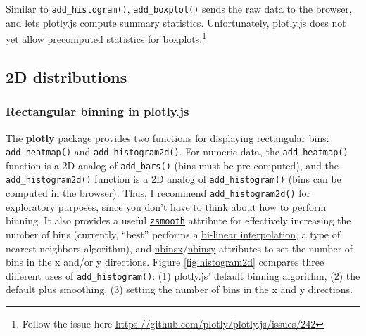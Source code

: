 \documentclass[12pt,]{isuthesis}
\let\rmarkdownfootnote\footnote%
\def\footnote{\protect\rmarkdownfootnote}
\begin{document}
Similar to \texttt{add\_histogram()}, \texttt{add\_boxplot()} sends the
raw data to the browser, and lets plotly.js compute summary statistics.
Unfortunately, plotly.js does not yet allow precomputed statistics for
boxplots.\footnote{Follow the issue here
  \url{https://github.com/plotly/plotly.js/issues/242}}

\subsection{2D distributions}\label{d-distributions}

\subsubsection{Rectangular binning in
plotly.js}\label{rectangular-binning-in-plotly.js}

The \textbf{plotly} package provides two functions for displaying
rectangular bins: \texttt{add\_heatmap()} and
\texttt{add\_histogram2d()}. For numeric data, the
\texttt{add\_heatmap()} function is a 2D analog of \texttt{add\_bars()}
(bins must be pre-computed), and the \texttt{add\_histogram2d()}
function is a 2D analog of \texttt{add\_histogram()} (bins can be
computed in the browser). Thus, I recommend \texttt{add\_histogram2d()}
for exploratory purposes, since you don't have to think about how to
perform binning. It also provides a useful
\href{https://plot.ly/r/reference/\#histogram2d-zsmooth}{\texttt{zsmooth}}
attribute for effectively increasing the number of bins (currently,
``best'' performs a
\href{https://en.wikipedia.org/wiki/Bilinear_interpolation}{bi-linear
interpolation}, a type of nearest neighbors algorithm), and
\href{https://plot.ly/r/reference/\#histogram2d-nbinsx}{nbinsx}/\href{https://plot.ly/r/reference/\#histogram2d-nbinsy}{nbinsy}
attributes to set the number of bins in the x and/or y directions.
Figure \ref{fig:histogram2d} compares three different uses of
\texttt{add\_histogram()}: (1) plotly.js' default binning algorithm, (2)
the default plus smoothing, (3) setting the number of bins in the x and
y directions.
\end{document}
